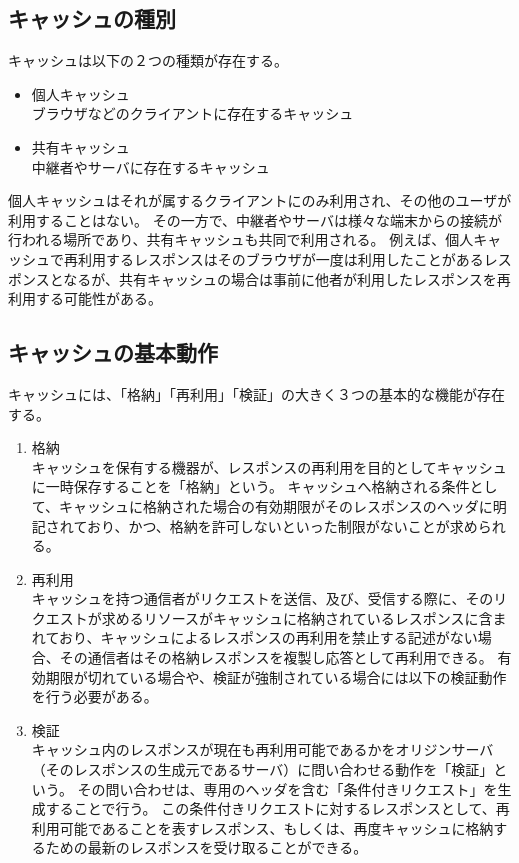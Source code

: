 \documentclass[12pt,a4paper]{jbook}
\begin{document}
\subsection{キャッシュの種別}
キャッシュは以下の２つの種類が存在する。
\begin{itemize}
\item 個人キャッシュ \\
ブラウザなどのクライアントに存在するキャッシュ
\item 共有キャッシュ \\
中継者やサーバに存在するキャッシュ
\end{itemize}
個人キャッシュはそれが属するクライアントにのみ利用され、その他のユーザが利用することはない。
その一方で、中継者やサーバは様々な端末からの接続が行われる場所であり、共有キャッシュも共同で利用される。
例えば、個人キャッシュで再利用するレスポンスはそのブラウザが一度は利用したことがあるレスポンスとなるが、共有キャッシュの場合は事前に他者が利用したレスポンスを再利用する可能性がある。

\subsection{キャッシュの基本動作}
キャッシュには、「格納」「再利用」「検証」の大きく３つの基本的な機能が存在する。

\begin{enumerate}
\item 格納\\
キャッシュを保有する機器が、レスポンスの再利用を目的としてキャッシュに一時保存することを「格納」という。
キャッシュへ格納される条件として、キャッシュに格納された場合の有効期限がそのレスポンスのヘッダに明記されており、かつ、格納を許可しないといった制限がないことが求められる。
\item 再利用\\
キャッシュを持つ通信者がリクエストを送信、及び、受信する際に、そのリクエストが求めるリソースがキャッシュに格納されているレスポンスに含まれており、キャッシュによるレスポンスの再利用を禁止する記述がない場合、その通信者はその格納レスポンスを複製し応答として再利用できる。
有効期限が切れている場合や、検証が強制されている場合には以下の検証動作を行う必要がある。
\item 検証\\
キャッシュ内のレスポンスが現在も再利用可能であるかをオリジンサーバ（そのレスポンスの生成元であるサーバ）に問い合わせる動作を「検証」という。
その問い合わせは、専用のヘッダを含む「条件付きリクエスト」を生成することで行う。
この条件付きリクエストに対するレスポンスとして、再利用可能であることを表すレスポンス、もしくは、再度キャッシュに格納するための最新のレスポンスを受け取ることができる。
\end{enumerate}
\end{document}
